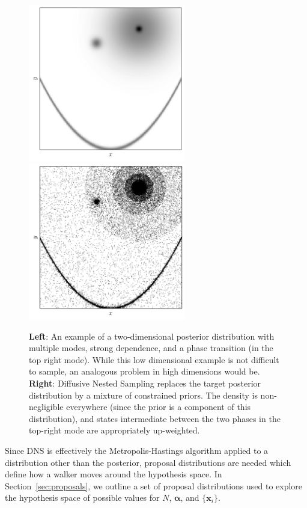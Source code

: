 \documentclass[letterpaper, 11pt]{article}
\newcommand{\hyperparams}{\boldsymbol{\alpha}}
\newcommand{\xx}{\mathbf{x}}
\begin{document}
\begin{figure}
\begin{minipage}[lr]{\textwidth}
\begin{center}
\includegraphics[width=2.7in]{challenges.pdf}
\includegraphics[width=2.7in]{dnest.png}
\end{center}
\end{minipage}
\caption{{\bf Left}: An example of a two-dimensional posterior distribution
with multiple modes, strong dependence, and a phase transition (in the top
right mode). While this low dimensional example is not difficult to sample,
an analogous problem in high dimensions would be. {\bf Right}: Diffusive
Nested Sampling replaces the target posterior distribution by a mixture of
constrained priors. The density is non-negligible everywhere (since the prior
is a component of this distribution), and states intermediate between the two
phases in the top-right mode are appropriately up-weighted.
\label{fig:challenges}}
\end{figure}


Since DNS is effectively the Metropolis-Hastings algorithm applied to a
distribution other than the posterior, proposal distributions are needed
which define how a walker moves around the hypothesis space.
In Section~\ref{sec:proposals}, we outline a set of proposal distributions used
to explore the hypothesis space of possible values for $N$, $\hyperparams$,
and $\{\xx_i\}$.
\end{document}
